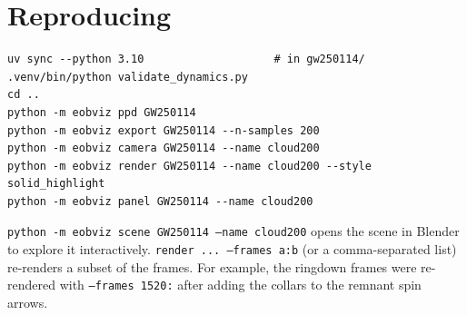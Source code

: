 \documentclass[11pt,a4paper]{article}
\newcommand{\code}[1]{\texttt{#1}}
\begin{document}
\section*{Reproducing}

\begin{verbatim}
uv sync --python 3.10                    # in gw250114/
.venv/bin/python validate_dynamics.py
cd ..
python -m eobviz ppd GW250114
python -m eobviz export GW250114 --n-samples 200
python -m eobviz camera GW250114 --name cloud200
python -m eobviz render GW250114 --name cloud200 --style solid_highlight
python -m eobviz panel GW250114 --name cloud200
\end{verbatim}
\code{python -m eobviz scene GW250114 --name cloud200} opens the scene in Blender to explore
it interactively. \code{render ... --frames a:b} (or a comma-separated list) re-renders a subset of the
frames. For example, the ringdown frames were re-rendered with \code{--frames 1520:} after
adding the collars to the remnant spin arrows.
\end{document}
